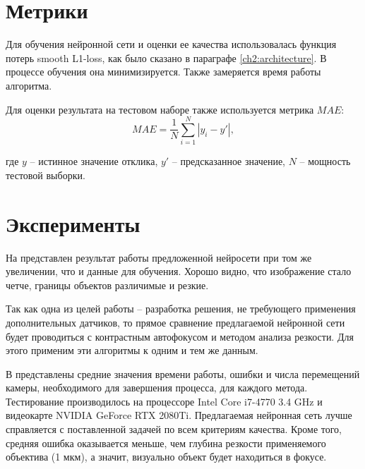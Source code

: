 \section{Метрики}
Для обучения нейронной сети и оценки ее качества использовалась функция потерь smooth L1-loss, как было сказано в параграфе \ref{ch2:architecture}. В процессе обучения она минимизируется. Также замеряется время работы алгоритма.

Для оценки результата на тестовом наборе также используется метрика $MAE$:
\begin{equation}
	MAE = \dfrac{1}{N} \sum\limits_{i=1}^N \left|y_i - y'\right|,
\end{equation}

где $y$ -- истинное значение отклика, $y'$ -- предсказанное значение, $N$ -- мощность тестовой выборки.



\section{Эксперименты} \label{ch3:experiments}

На  представлен результат работы предложенной нейросети при том же увеличении, что и данные для обучения. Хорошо видно, что изображение стало четче, границы объектов различимые и резкие.

Так как одна из целей работы -- разработка решения, не требующего применения дополнительных датчиков, то прямое сравнение предлагаемой нейронной сети будет проводиться с контрастным автофокусом и методом анализа резкости. Для этого применим эти алгоритмы к одним и тем же данным.

В  представлены средние значения времени работы, ошибки и числа перемещений камеры, необходимого для завершения процесса, для каждого метода. Тестирование производилось на процессоре Intel Core i7-4770 3.4 GHz и видеокарте NVIDIA GeForce RTX 2080Ti. Предлагаемая нейронная сеть лучше справляется с поставленной задачей по всем критериям качества. Кроме того, средняя ошибка оказывается меньше, чем глубина резкости применяемого объектива (1 мкм), а значит, визуально объект будет находиться в фокусе. 


